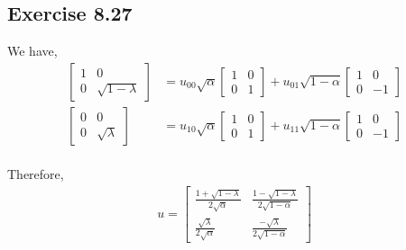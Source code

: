 \documentclass[a4paper,12pt]{article}
\begin{document}
\subsection*{Exercise 8.27}
We have,
\begin{align*}
    \begin{bmatrix}
        1 & 0\\
        0 &\sqrt{1-\lambda}
    \end{bmatrix}&=
    u_{00}\sqrt{\alpha}
    \begin{bmatrix}
        1 &0\\
        0& 1
    \end{bmatrix}
    +u_{01}\sqrt{1-\alpha}
    \begin{bmatrix}
        1&0\\
        0& -1
    \end{bmatrix}\\
    \begin{bmatrix}
        0 & 0\\
        0 &\sqrt{\lambda}
    \end{bmatrix}&=
    u_{10}\sqrt{\alpha}
    \begin{bmatrix}
        1 &0\\
        0& 1
    \end{bmatrix}
    +u_{11}\sqrt{1-\alpha}
    \begin{bmatrix}
        1&0\\
        0& -1
    \end{bmatrix}
\end{align*}\\
Therefore,\\
\begin{align*}
    u=
    \begin{bmatrix}
      \frac{1+\sqrt{1-\lambda}}{2\sqrt{\alpha}}&  \frac{1-\sqrt{1-\lambda}}{2\sqrt{1-\alpha}}\\
      \frac{\sqrt{\lambda}}{2\sqrt{\alpha}} & \frac{-\sqrt{\lambda}}{2\sqrt{1-\alpha}} 
    \end{bmatrix}
\end{align*}
\end{document}
